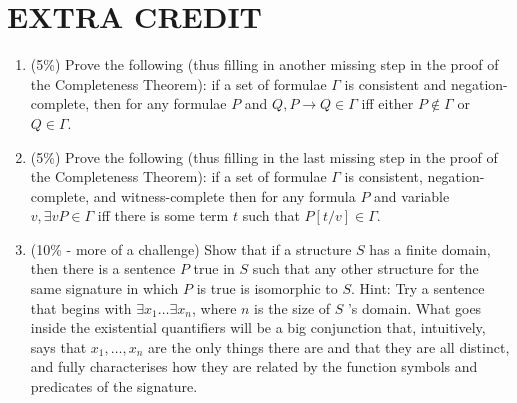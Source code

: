 \documentclass[10pt]{article}
\begin{document}
\section{EXTRA CREDIT}
\begin{enumerate}
  \item (5\%) Prove the following (thus filling in another missing step in the proof of the Completeness Theorem): if a set of formulae \(\Gamma\) is consistent and negation-complete, then for any formulae \(P\) and \(Q, P \rightarrow Q \in \Gamma\) iff either \(P \notin \Gamma\) or \(Q \in \Gamma\).

  \item (5\%) Prove the following (thus filling in the last missing step in the proof of the Completeness Theorem): if a set of formulae \(\Gamma\) is consistent, negation-complete, and witness-complete then for any formula \(P\) and variable \(v, \exists v P \in \Gamma\) iff there is some term \(t\) such that \(P[t / v] \in \Gamma\).

  \item (10\% - more of a challenge) Show that if a structure \(S\) has a finite domain, then there is a sentence \(P\) true in \(S\) such that any other structure for the same signature in which \(P\) is true is isomorphic to \(S\). Hint: Try a sentence that begins with \(\exists x_{1} \ldots \exists x_{n}\), where \(n\) is the size of \(S\) 's domain. What goes inside the existential quantifiers will be a big conjunction that, intuitively, says that \(x_{1}, \ldots, x_{n}\) are the only things there are and that they are all distinct, and fully characterises how they are related by the function symbols and predicates of the signature.

\end{enumerate}
\end{document}
